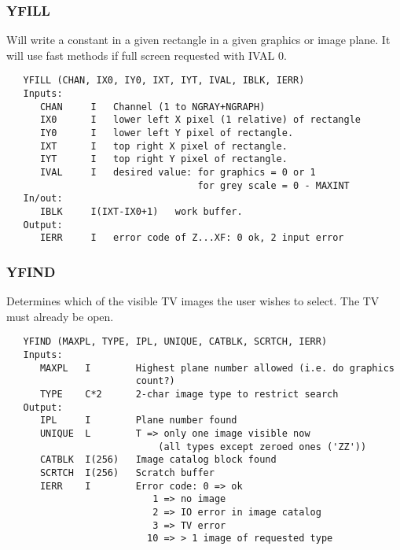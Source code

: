 \subsubsection{YFILL}
Will write a constant in a given rectangle in a given graphics
or image plane.  It will use fast methods if full screen requested
with IVAL 0.
\begin{verbatim}
   YFILL (CHAN, IX0, IY0, IXT, IYT, IVAL, IBLK, IERR)
   Inputs:
      CHAN     I   Channel (1 to NGRAY+NGRAPH)
      IX0      I   lower left X pixel (1 relative) of rectangle
      IY0      I   lower left Y pixel of rectangle.
      IXT      I   top right X pixel of rectangle.
      IYT      I   top right Y pixel of rectangle.
      IVAL     I   desired value: for graphics = 0 or 1
                                  for grey scale = 0 - MAXINT
   In/out:
      IBLK     I(IXT-IX0+1)   work buffer.
   Output:
      IERR     I   error code of Z...XF: 0 ok, 2 input error

\end{verbatim}

\subsubsection{YFIND}
Determines which of the visible TV images the user wishes
to select.  The TV must already be open.
\begin{verbatim}
   YFIND (MAXPL, TYPE, IPL, UNIQUE, CATBLK, SCRTCH, IERR)
   Inputs:
      MAXPL   I        Highest plane number allowed (i.e. do graphics
                       count?)
      TYPE    C*2      2-char image type to restrict search
   Output:
      IPL     I        Plane number found
      UNIQUE  L        T => only one image visible now
                           (all types except zeroed ones ('ZZ'))
      CATBLK  I(256)   Image catalog block found
      SCRTCH  I(256)   Scratch buffer
      IERR    I        Error code: 0 => ok
                          1 => no image
                          2 => IO error in image catalog
                          3 => TV error
                         10 => > 1 image of requested type

\end{verbatim}

